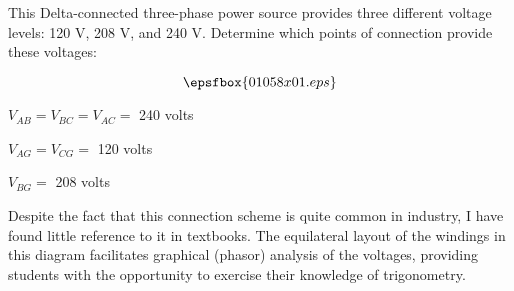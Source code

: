

This Delta-connected three-phase power source provides three different voltage levels: 120 V, 208 V, and 240 V.  Determine which points of connection provide these voltages:

$$\epsfbox{01058x01.eps}$$







$V_{AB} = V_{BC} = V_{AC} =$ 240 volts

\vskip 10pt

$V_{AG} = V_{CG} =$ 120 volts

\vskip 10pt

$V_{BG} =$ 208 volts







Despite the fact that this connection scheme is quite common in industry, I have found little reference to it in textbooks.  The equilateral layout of the windings in this diagram facilitates graphical (phasor) analysis of the voltages, providing students with the opportunity to exercise their knowledge of trigonometry.




